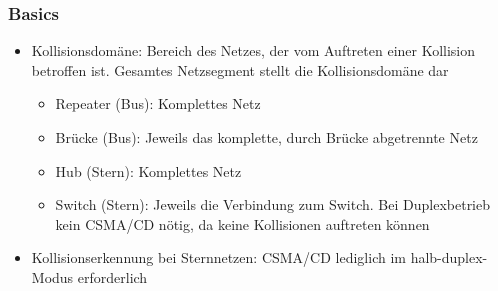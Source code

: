 \subsubsection{Basics}
\begin{itemize}
	\item Kollisionsdomäne: Bereich des Netzes, der vom Auftreten einer Kollision betroffen ist. Gesamtes Netzsegment stellt die Kollisionsdomäne dar
	\begin{itemize}
		\item Repeater (Bus): Komplettes Netz
		\item Brücke (Bus): Jeweils das komplette, durch Brücke abgetrennte Netz
		\item Hub (Stern): Komplettes Netz
		\item Switch (Stern): Jeweils die Verbindung zum Switch. Bei Duplexbetrieb kein CSMA/CD nötig, da keine Kollisionen auftreten können
	\end{itemize}
	\item Kollisionserkennung bei Sternnetzen: CSMA/CD lediglich im halb-duplex-Modus erforderlich
\end{itemize}

